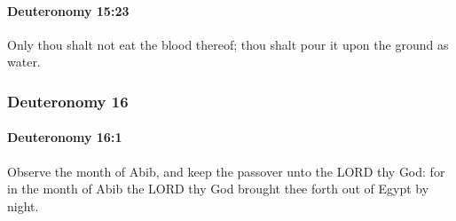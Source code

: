 		\paragraph{Deuteronomy 15:23} %
			\label{DEUTERONOMY-15-23}

			Only thou shalt not eat the blood thereof; thou shalt pour it upon the ground as water.

	\subsubsection{Deuteronomy 16} %
		\label{DEUTERONOMY-16}

		\paragraph{Deuteronomy 16:1} %
			\label{DEUTERONOMY-16-1}

			Observe the month of Abib, and keep the passover unto the LORD thy God: for in the month of Abib the LORD thy God brought thee forth out of Egypt by night.

